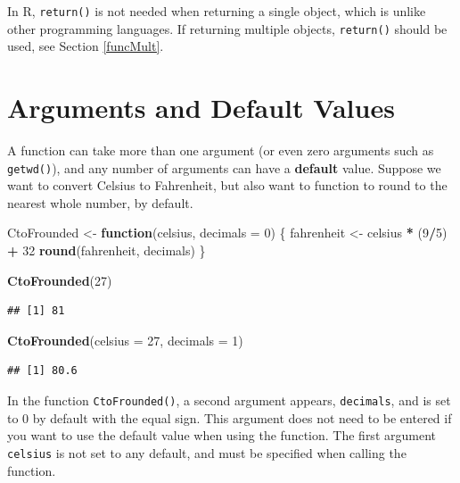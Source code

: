 \documentclass[
]{book}
\newenvironment{Shaded}{\begin{snugshade}}{\end{snugshade}}
\newcommand{\AttributeTok}[1]{\textcolor[rgb]{0.13,0.29,0.53}{#1}}
\newcommand{\ControlFlowTok}[1]{\textcolor[rgb]{0.13,0.29,0.53}{\textbf{#1}}}
\newcommand{\DecValTok}[1]{\textcolor[rgb]{0.00,0.00,0.81}{#1}}
\newcommand{\FunctionTok}[1]{\textcolor[rgb]{0.13,0.29,0.53}{\textbf{#1}}}
\newcommand{\NormalTok}[1]{#1}
\newcommand{\OtherTok}[1]{\textcolor[rgb]{0.56,0.35,0.01}{#1}}
\newcommand{\SpecialCharTok}[1]{\textcolor[rgb]{0.81,0.36,0.00}{\textbf{#1}}}
\theoremstyle{definition}
\theoremstyle{definition}
\theoremstyle{definition}
\theoremstyle{definition}
\theoremstyle{remark}
\begin{document}
In R, \texttt{return()} is not needed when returning a single object, which is unlike other programming languages. If returning multiple objects, \texttt{return()} should be used, see Section \ref{funcMult}.

\hypertarget{arguments-and-default-values}{%
\section{Arguments and Default Values}\label{arguments-and-default-values}}

A function can take more than one argument (or even zero arguments such as \texttt{getwd()}), and any number of arguments can have a \textbf{default} value. Suppose we want to convert Celsius to Fahrenheit, but also want to function to round to the nearest whole number, by default.

\begin{Shaded}
\begin{Highlighting}[]
\NormalTok{CtoFrounded }\OtherTok{\textless{}{-}} \ControlFlowTok{function}\NormalTok{(celsius, }\AttributeTok{decimals =} \DecValTok{0}\NormalTok{) \{}
\NormalTok{  fahrenheit }\OtherTok{\textless{}{-}}\NormalTok{ celsius }\SpecialCharTok{*}\NormalTok{ (}\DecValTok{9}\SpecialCharTok{/}\DecValTok{5}\NormalTok{) }\SpecialCharTok{+} \DecValTok{32}
  \FunctionTok{round}\NormalTok{(fahrenheit, decimals)}
\NormalTok{\}}

\FunctionTok{CtoFrounded}\NormalTok{(}\DecValTok{27}\NormalTok{)}
\end{Highlighting}
\end{Shaded}

\begin{verbatim}
## [1] 81
\end{verbatim}

\begin{Shaded}
\begin{Highlighting}[]
\FunctionTok{CtoFrounded}\NormalTok{(}\AttributeTok{celsius =} \DecValTok{27}\NormalTok{, }\AttributeTok{decimals =} \DecValTok{1}\NormalTok{)}
\end{Highlighting}
\end{Shaded}

\begin{verbatim}
## [1] 80.6
\end{verbatim}

In the function \texttt{CtoFrounded()}, a second argument appears, \texttt{decimals}, and is set to 0 by default with the equal sign. This argument does not need to be entered if you want to use the default value when using the function. The first argument \texttt{celsius} is not set to any default, and must be specified when calling the function.
\end{document}
